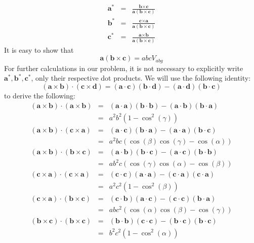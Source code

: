 \documentclass[prb]{revtex4}%
\begin{document}
\begin{eqnarray}
  \textbf{a}^* &=& \frac{\textbf{b} \times \textbf{c}}{\textbf{a}(\textbf{b} \times \textbf{c})} \\
  \textbf{b}^* &=& \frac{\textbf{c} \times \textbf{a}}{\textbf{a}(\textbf{b} \times \textbf{c})}  \\
  \textbf{c}^* &=& \frac{\textbf{a} \times \textbf{b}}{\textbf{a}(\textbf{b} \times \textbf{c})}
\end{eqnarray}
It is easy to show that
\begin{equation}
    \textbf{a}(\textbf{b} \times \textbf{c}) = a b c V_{abg}
\end{equation}
For further calculations in our problem, it is not necessary to explicitly write $\textbf{a}^*, \textbf{b}^*, \textbf{c}^*$, only their respective dot products. We will use the following identity:
\begin{equation}
    (\textbf{a} \times \textbf{b})\cdot(\textbf{c} \times \textbf{d}) = (\textbf{a}\cdot\textbf{c})(\textbf{b}\cdot\textbf{d}) -(\textbf{a}\cdot\textbf{d})(\textbf{b}\cdot\textbf{c})
\end{equation}
to derive the following:
\begin{eqnarray}
    \nonumber  (\textbf{a} \times \textbf{b})\cdot(\textbf{a} \times \textbf{b}) &=& (\textbf{a}\cdot\textbf{a})(\textbf{b}\cdot\textbf{b}) -(\textbf{a}\cdot\textbf{b})(\textbf{b}\cdot\textbf{a}) \\
    &=& a^2 b^2 (1-\cos^2(\gamma))  \\
    \nonumber  (\textbf{a} \times \textbf{b})\cdot(\textbf{c} \times \textbf{a}) &=& (\textbf{a}\cdot\textbf{c})(\textbf{b}\cdot\textbf{a}) -(\textbf{a}\cdot\textbf{a})(\textbf{b}\cdot\textbf{c}) \\
    &=&  a^2 b c (\cos(\beta) \cos(\gamma)-\cos(\alpha)) \\
    \nonumber  (\textbf{a} \times \textbf{b})\cdot(\textbf{b} \times \textbf{c}) &=& (\textbf{a}\cdot\textbf{b})(\textbf{b}\cdot\textbf{c}) -(\textbf{a}\cdot\textbf{c})(\textbf{b}\cdot\textbf{b}) \\
    &=&   a b^2 c (\cos(\gamma) \cos(\alpha) - \cos(\beta))\\
    \nonumber  (\textbf{c} \times \textbf{a})\cdot(\textbf{c} \times \textbf{a}) &=& (\textbf{c}\cdot\textbf{c})(\textbf{a}\cdot\textbf{a}) -(\textbf{c}\cdot\textbf{a})(\textbf{c}\cdot\textbf{a}) \\
    &=&  a^2 c^2 (1-\cos^2(\beta)) \\
    \nonumber  (\textbf{c} \times \textbf{a})\cdot(\textbf{b} \times \textbf{c}) &=& (\textbf{c}\cdot\textbf{b})(\textbf{a}\cdot\textbf{c}) -(\textbf{c}\cdot\textbf{c})(\textbf{b}\cdot\textbf{a}) \\
    &=&  a b c^2 (\cos(\alpha)\cos(\beta)-\cos(\gamma)) \\
    \nonumber  (\textbf{b} \times \textbf{c})\cdot(\textbf{b} \times \textbf{c}) &=& (\textbf{b}\cdot\textbf{b})(\textbf{c}\cdot\textbf{c}) -(\textbf{b}\cdot\textbf{c})(\textbf{b}\cdot\textbf{c}) \\
    &=& b^2 c^2 (1-\cos^2(\alpha))
\end{eqnarray}
\end{document}
